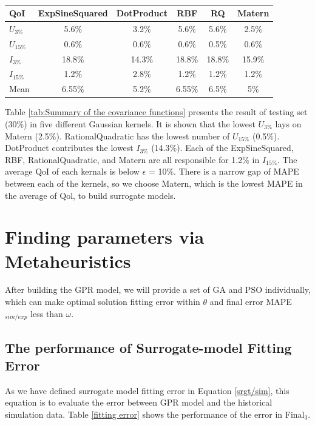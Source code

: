 \begin{minipage}{\linewidth}
	\centering
	\renewcommand\arraystretch{1}
	~\\
	 \label{tab:Summary of the covariance functions} 
	\begin{tabular}{lccccc}
		\hline
		{\small QoI} & {\small ExpSineSquared} & {\small DotProduct} & {\small RBF} & {\small RQ} & {\small Matern}\\
		\hline
		{\small $U_{3{\%}}$}              &  
		5.6${\%}$ & 3.2${\%}$ & 5.6${\%}$ & 5.6${\%}$ & 2.5${\%}$   \\
		{\small $U_{15{\%}}$}              &  
		0.6${\%}$ & 0.6${\%}$ & 0.6${\%}$ & 0.5${\%}$ & 0.6${\%}$     \\
		{\small $I_{3{\%}}$}           & 
		18.8${\%}$ & 14.3${\%}$ &18.8${\%}$ & 18.8${\%}$ & 15.9${\%}$   \\
		{\small $I_{15{\%}}$} &
		1.2${\%}$ & 2.8${\%}$ &1.2${\%}$ & 1.2${\%}$ & 1.2${\%}$           \\
		\hline
		{\small Mean}              &  
		6.55${\%}$ & 5.2${\%}$ & 6.55${\%}$ & 6.5${\%}$ & 5${\%}$     \\
		\hline
	\end{tabular}
\end{minipage}

Table \ref{tab:Summary of the covariance functions} presents the result of testing set (30${\%}$) in five different Gaussian kernels. It is shown that the lowest $U_{3{\%}}$ lays on Matern (2.5${\%}$). RationalQuadratic has the lowest number of $U_{15{\%}}$ (0.5${\%}$). DotProduct contributes the lowest $I_{3{\%}}$ (14.3${\%}$). Each of the ExpSineSquared, RBF, RationalQuadratic, and Matern are all responsible for 1.2${\%}$ in $I_{15{\%}}$. The average QoI of each kernals is below $\epsilon$ = 10${\%}$. There is a narrow gap of MAPE between each of the kernels, so we choose Matern, which is the lowest MAPE in the average of Qol, to build surrogate models.

\section{Finding parameters via Metaheuristics}

After building the GPR model, we will provide a set of GA and PSO individually, which can make optimal solution fitting error within $\theta$ and final error MAPE$_{sim/exp}$ less than $\omega$.

\subsection{The performance of Surrogate-model Fitting Error}
As we have defined surrogate model fitting error in Equation \ref {srgt/sim}, this equation is to evaluate the error between GPR model and the historical simulation data. Table \ref {fitting error} shows the performance of the error in Final${_3}$.

